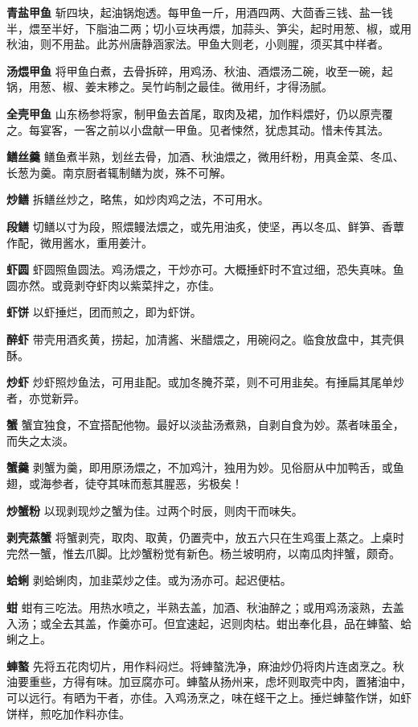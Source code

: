 \documentclass[]{article}
\begin{document}
\textbf{青盐甲鱼}
斩四块，起油锅炮透。每甲鱼一斤，用酒四两、大茴香三钱、盐一钱半，煨至半好，下脂油二两；切小豆块再煨，加蒜头、笋尖，起时用葱、椒，或用秋油，则不用盐。此苏州唐静涵家法。甲鱼大则老，小则腥，须买其中样者。

\textbf{汤煨甲鱼}
将甲鱼白煮，去骨拆碎，用鸡汤、秋油、酒煨汤二碗，收至一碗，起锅，用葱、椒、姜末糁之。吴竹屿制之最佳。微用纤，才得汤腻。

\textbf{全壳甲鱼}
山东杨参将家，制甲鱼去首尾，取肉及裙，加作料煨好，仍以原壳覆之。每宴客，一客之前以小盘献一甲鱼。见者悚然，犹虑其动。惜未传其法。

\textbf{鳝丝羹}
鳝鱼煮半熟，划丝去骨，加酒、秋油煨之，微用纤粉，用真金菜、冬瓜、长葱为羹。南京厨者辄制鳝为炭，殊不可解。

\textbf{炒鳝} 拆鳝丝炒之，略焦，如炒肉鸡之法，不可用水。

\textbf{段鳝}
切鳝以寸为段，照煨鳗法煨之，或先用油炙，使坚，再以冬瓜、鲜笋、香蕈作配，微用酱水，重用姜汁。

\textbf{虾圆}
虾圆照鱼圆法。鸡汤煨之，干炒亦可。大概捶虾时不宜过细，恐失真味。鱼圆亦然。或竟剥夺虾肉以紫菜拌之，亦佳。

\textbf{虾饼} 以虾捶烂，团而煎之，即为虾饼。

\textbf{醉虾}
带壳用酒炙黄，捞起，加清酱、米醋煨之，用碗闷之。临食放盘中，其壳俱酥。

\textbf{炒虾}
炒虾照炒鱼法，可用韭配。或加冬腌芥菜，则不可用韭矣。有捶扁其尾单炒者，亦觉新异。

\textbf{蟹}
蟹宜独食，不宜搭配他物。最好以淡盐汤煮熟，自剥自食为妙。蒸者味虽全，而失之太淡。

\textbf{蟹羹}
剥蟹为羹，即用原汤煨之，不加鸡汁，独用为妙。见俗厨从中加鸭舌，或鱼翅，或海参者，徒夺其味而惹其腥恶，劣极矣！

\textbf{炒蟹粉} 以现剥现炒之蟹为佳。过两个时辰，则肉干而味失。

\textbf{剥壳蒸蟹}
将蟹剥壳，取肉、取黄，仍置壳中，放五六只在生鸡蛋上蒸之。上桌时完然一蟹，惟去爪脚。比炒蟹粉觉有新色。杨兰坡明府，以南瓜肉拌蟹，颇奇。

\textbf{蛤蜊} 剥蛤蜊肉，加韭菜炒之佳。或为汤亦可。起迟便枯。

\textbf{蚶}
蚶有三吃法。用热水喷之，半熟去盖，加酒、秋油醉之；或用鸡汤滚熟，去盖入汤；或全去其盖，作羹亦可。但宜速起，迟则肉枯。蚶出奉化县，品在蛼螯、蛤蜊之上。

\textbf{蛼螯}
先将五花肉切片，用作料闷烂。将蛼螯洗净，麻油炒仍将肉片连卤烹之。秋油要重些，方得有味。加豆腐亦可。蛼螯从扬州来，虑坏则取壳中肉，置猪油中，可以远行。有晒为干者，亦佳。入鸡汤烹之，味在蛏干之上。捶烂蛼螯作饼，如虾饼样，煎吃加作料亦佳。
\end{document}

